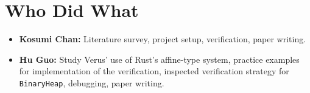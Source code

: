 \documentclass[conference]{IEEEtran}
\begin{document}
\section{Who Did What}
\begin{itemize}
\item \textbf{Kosumi Chan:} Literature survey, project setup, verification, paper writing. 
\item \textbf{Hu Guo:} Study Verus' use of Rust's affine-type system, practice examples for implementation of the verification, inspected verification strategy for \texttt{BinaryHeap}, debugging, paper writing.
\end{itemize}

\printbibliography
\end{document}
